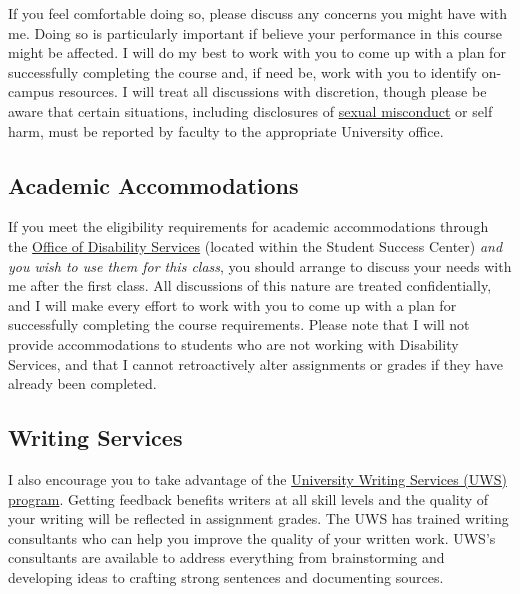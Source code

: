 \documentclass[]{book}
\theoremstyle{definition}
\theoremstyle{definition}
\theoremstyle{definition}
\theoremstyle{remark}
\begin{document}
If you feel comfortable doing so, please discuss any concerns you might
have with me. Doing so is particularly important if believe your
performance in this course might be affected. I will do my best to work
with you to come up with a plan for successfully completing the course
and, if need be, work with you to identify on-campus resources. I will
treat all discussions with discretion, though please be aware that
certain situations, including disclosures of
\href{/compassionate-coursework.html}{sexual misconduct} or self harm,
must be reported by faculty to the appropriate University office.

\hypertarget{academic-accommodations}{%
\subsection{Academic Accommodations}\label{academic-accommodations}}

If you meet the eligibility requirements for academic accommodations
through the
\href{https://www.slu.edu/life-at-slu/student-success-center/disability-services/index.php}{Office
of Disability Services} (located within the Student Success Center)
\emph{and you wish to use them for this class}, you should arrange to
discuss your needs with me after the first class. All discussions of
this nature are treated confidentially, and I will make every effort to
work with you to come up with a plan for successfully completing the
course requirements. Please note that I will not provide accommodations
to students who are not working with Disability Services, and that I
cannot retroactively alter assignments or grades if they have already
been completed.

\hypertarget{writing-services}{%
\subsection{Writing Services}\label{writing-services}}

I also encourage you to take advantage of the
\href{https://www.slu.edu/life-at-slu/student-success-center/academic-support/university-writing-services/index.php}{University
Writing Services (UWS) program}. Getting feedback benefits writers at
all skill levels and the quality of your writing will be reflected in
assignment grades. The UWS has trained writing consultants who can help
you improve the quality of your written work. UWS's consultants are
available to address everything from brainstorming and developing ideas
to crafting strong sentences and documenting sources.
\end{document}
